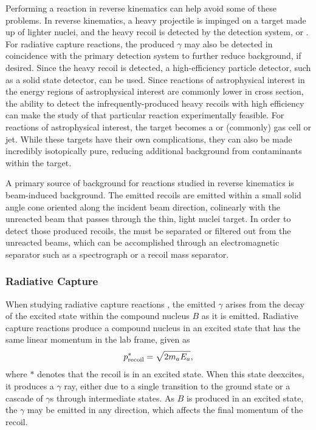 Performing a reaction in reverse kinematics can help avoid some of these
problems. In reverse kinematics, a heavy projectile is impinged on a target
made up of lighter nuclei, and the heavy recoil is detected by the detection
system, or . For radiative capture reactions, the produced
$\gamma$ may also be detected in coincidence with the primary detection system
to further reduce background, if desired. Since the heavy recoil is detected, a
high-efficiency particle detector, such as a solid state detector, can be used.
Since reactions of astrophysical interest in the energy regions of
astrophysical interest are commonly lower in cross section, the ability to
detect the infrequently-produced heavy recoils with high efficiency can make
the study of that particular reaction experimentally feasible. For reactions of
astrophysical interest, the target becomes a  or 
(commonly) gas cell or jet. While these targets have their own complications,
they can also be made incredibly isotopically pure, reducing additional
background from contaminants within the target.

A primary source of background for reactions studied in reverse kinematics is
beam-induced background. The emitted recoils are emitted within a small solid
angle cone oriented along the incident beam direction, colinearly with the
unreacted beam that passes through the thin, light nuclei target. In order to
detect those produced recoils, the must be separated or filtered out from the
unreacted beams, which can be accomplished through an electromagnetic separator
such as a spectrograph or a recoil mass separator.

\subsubsection{Radiative Capture}
When studying radiative capture reactions , the emitted
$\gamma$ arises from the decay of the excited state within the compound nucleus
$B$ as it is emitted. Radiative capture reactions produce a compound nucleus in
an excited state that
has the same linear momentum in the lab frame, given as
\[
    p^*_{\rm{recoil}} = \sqrt{2m_aE_a},
\]
where $*$ denotes that the recoil is in an excited state. When this state
deexcites, it produces a $\gamma$ ray, either due to a single transition to
the ground state or a cascade of $\gamma$s through intermediate states. As $B$
is produced in an excited state, the $\gamma$ may be emitted in any direction,
which affects the final momentum of the recoil.

